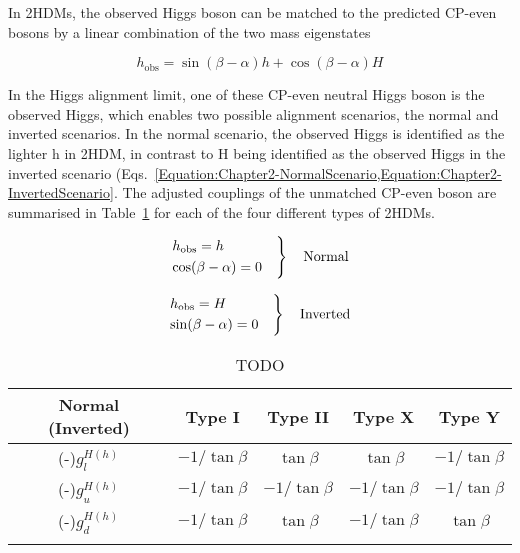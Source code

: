 In 2HDMs, the observed Higgs boson can be matched to the predicted CP-even bosons by a linear combination of the two mass eigenstates 

\begin{equation}
    h_{\text{obs}} = \sin{(\beta - \alpha)} h + \cos{(\beta - \alpha)} H 
\end{equation}

In the Higgs alignment limit, one of these CP-even neutral Higgs boson is the observed Higgs, which enables two possible alignment scenarios, the normal and inverted scenarios. In the normal scenario, the observed Higgs is identified as the lighter h in 2HDM, in contrast to H being identified as the observed Higgs in the inverted scenario (Eqs.~\ref{Equation:Chapter2-NormalScenario,Equation:Chapter2-InvertedScenario}. The adjusted couplings of the unmatched CP-even boson are summarised in Table~\ref{Table:Chapter2_2HDM-CouplingsAlignmentLimit} for each of the four different types of 2HDMs.

\begin{equation}
\begin{rcases}
  h_{\text{obs}} = h \\
  \cos(\beta-\alpha) = 0 
\quad \end{rcases}
\quad \text{Normal}
\label{Equation:Chapter2-NormalScenario}
\end{equation}

\begin{equation}
\begin{rcases}
  h_{\text{obs}} = H \\
  \sin(\beta-\alpha) = 0
\quad \end{rcases}
\quad \text{Inverted}
\label{Equation:Chapter2-InvertedScenario}
\end{equation}


\begin{table}[h]
\centering
\renewcommand{\arraystretch}{1.5} %
\setlength{\tabcolsep}{12pt} %
\begin{tabular}{|c|c|c|c|c|}
\hline
Normal (Inverted)     & Type I                     & Type II                     & Type X                                        & Type Y                      \\ \hline \hline
(-)$g_l^{H(h)}$ & $-1/\tan{\beta}$  & $\tan{\beta}$  & $\tan{\beta}$                    & $-1/\tan{\beta}$  \\ \arrayrulecolor{lightgray} \hline
(-)$g_u^{H(h)}$ & $-1/\tan{\beta}$  & $-1/\tan{\beta}$  & $-1/\tan{\beta}$                    & $-1/\tan{\beta}$  \\ \arrayrulecolor{lightgray} \hline
(-)$g_d^{H(h)}$ & $-1/\tan{\beta}$  & $\tan{\beta}$  & $-1/\tan{\beta}$                    & $\tan{\beta}$  \\ \arrayrulecolor{black} \hline
\end{tabular}
\caption{TODO}
\label{Table:Chapter2_2HDM-CouplingsAlignmentLimit}
\end{table}

